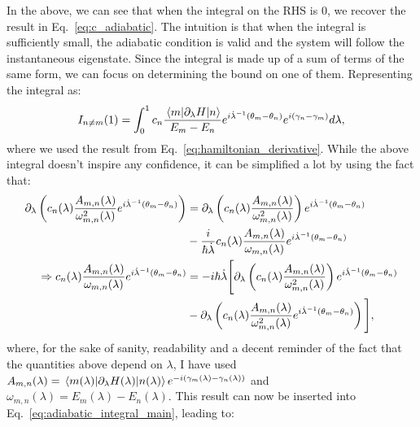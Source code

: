     In the above, we can see that when the integral on the RHS is 0, we recover the result in Eq.~\eqref{eq:c_adiabatic}. The intuition is that when the integral is sufficiently small, the adiabatic condition is valid and the system will follow the instantaneous eigenstate. Since the integral is made up of a sum of terms of the same form, we can focus on determining the bound on one of them. Representing the integral as:
    \begin{equation}\label{eq:adiabatic_integral_main}
        I_{n \neq m}(1) = \int_0^1 c_n \frac{\mel{m}{\partial_{\lambda}H}{n}}{E_m - E_n} e^{i\dot{\lambda}^{-1}(\theta_m - \theta_n)} e^{i(\gamma_n - \gamma_m)} d \lambda,
    \end{equation}
    where we used the result from Eq.~\eqref{eq:hamiltonian_derivative}. While the above integral doesn't inspire any confidence, it can be simplified a lot by using the fact that:
    \begin{equation}
        \begin{aligned}\label{eq:simplifying_adiabatic_integral}
            \partial_{\lambda} \left( c_n(\lambda) \frac{A_{m,n}(\lambda)}{\omega_{m,n}^2(\lambda)}e^{i\dot{\lambda}^{-1}(\theta_m - \theta_n)} \right) &= \partial_{\lambda} \left( c_n(\lambda) \frac{A_{m,n}(\lambda)}{\omega_{m,n}^2(\lambda)}\right) e^{i\dot{\lambda}^{-1}(\theta_m - \theta_n)} \\ &- \frac{i}{\hbar \dot{\lambda}} c_n(\lambda) \frac{A_{m,n}(\lambda)}{\omega_{m,n}(\lambda)}e^{i\dot{\lambda}^{-1}(\theta_m - \theta_n)} \\ 
            \Rightarrow c_n(\lambda) \frac{A_{m,n}(\lambda)}{\omega_{m,n}(\lambda)}e^{i\dot{\lambda}^{-1}(\theta_m - \theta_n)} &= -i\hbar\dot{\lambda} \Bigg[ \partial_{\lambda} \left(c_n(\lambda) \frac{A_{m,n}(\lambda)}{\omega_{m,n}^2(\lambda)} \right) e^{i\dot{\lambda}^{-1}(\theta_m - \theta_n)} \\
            &- \partial_{\lambda} \left( c_n(\lambda) \frac{A_{m,n}(\lambda)}{\omega_{m,n}^2(\lambda)}e^{i\dot{\lambda}^{-1}(\theta_m - \theta_n)} \right) \Bigg],
        \end{aligned}
    \end{equation}
    where, for the sake of sanity, readability and a decent reminder of the fact that the quantities above depend on $\lambda$, I have used $A_{m,n}(\lambda) = \mel{m(\lambda)}{\partial_{\lambda}H(\lambda)}{n(\lambda)}e^{-i(\gamma_m(\lambda) - \gamma_n(\lambda))}$ and $\omega_{m,n}(\lambda) = E_m(\lambda) - E_n(\lambda)$. This result can now be inserted into Eq.~\eqref{eq:adiabatic_integral_main}, leading to:
